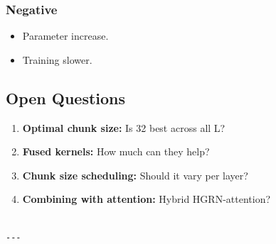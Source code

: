 \subsubsection{Negative}
\begin{itemize}
\item Parameter increase.
\item Training slower.

\end{itemize}
\subsection{Open Questions}

\begin{enumerate}
\item \textbf{Optimal chunk size:} Is 32 best across all L?
\item \textbf{Fused kernels:} How much can they help?
\item \textbf{Chunk size scheduling:} Should it vary per layer?
\item \textbf{Combining with attention:} Hybrid HGRN-attention?
\end{enumerate}
\begin{lstlisting}

---
\end{lstlisting}